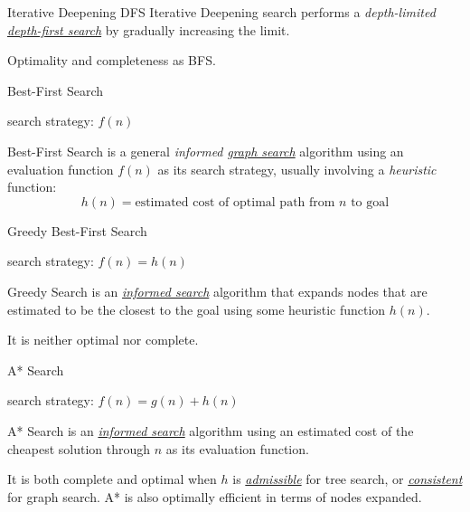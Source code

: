 \documentclass{cognito}
\begin{document}
\begin{note}{Iterative Deepening DFS}
	Iterative Deepening search performs a \emph{depth-limited} \hyperref[note:Depth-First Search]{\it depth-first search}
	by gradually increasing the limit.
	\begin{remark}
		Optimality and completeness as BFS. 
	\end{remark}
	\vspace{-5pt}
\end{note}

\begin{note}{Best-First Search}
	\begin{mdframed}[linecolor=black!25!white]
		search strategy: $f(n)$
	\end{mdframed}
	Best-First Search is a general \emph{informed} \hyperref[note:Graph Search]{\emph{graph search}} algorithm using
	an evaluation function $f(n)$ as its search strategy, usually involving a
	\emph{heuristic} function:
	$$
		h(n) = \text{estimated cost of optimal path from $n$ to goal}
	$$
	\vspace{-10pt}
\end{note}


\begin{note}{Greedy Best-First Search}
	\begin{mdframed}[linecolor=black!25!white]
		search strategy: $f(n) = h(n)$
	\end{mdframed}
	Greedy Search is an \hyperref[note:Best-First Search]{\it informed search} algorithm that expands nodes that are estimated
	to be the closest to the goal using some heuristic function $h(n)$.
	\begin{remark} It is neither optimal nor complete. \end{remark}
	\vspace{-5pt}
\end{note}

\begin{note}{A* Search}
	\begin{mdframed}[linecolor=black!25!white]
		search strategy: $f(n) = g(n) + h(n)$
	\end{mdframed}
	A* Search is an \hyperref[note:Best-First Search]{\it informed search} algorithm using
	an estimated cost of the cheapest solution through $n$ as its
	evaluation function.
	\begin{remark} It is both complete and optimal when $h$ is \hyperref[note:Heuristic Admissibility]{\it admissible} for tree search,
		or \hyperref[note:Heuristic Consistency]{\it consistent} for graph search.
		A* is also optimally efficient in terms of nodes expanded.
	\end{remark}
	\vspace{-5pt}
\end{note}
\end{document}
